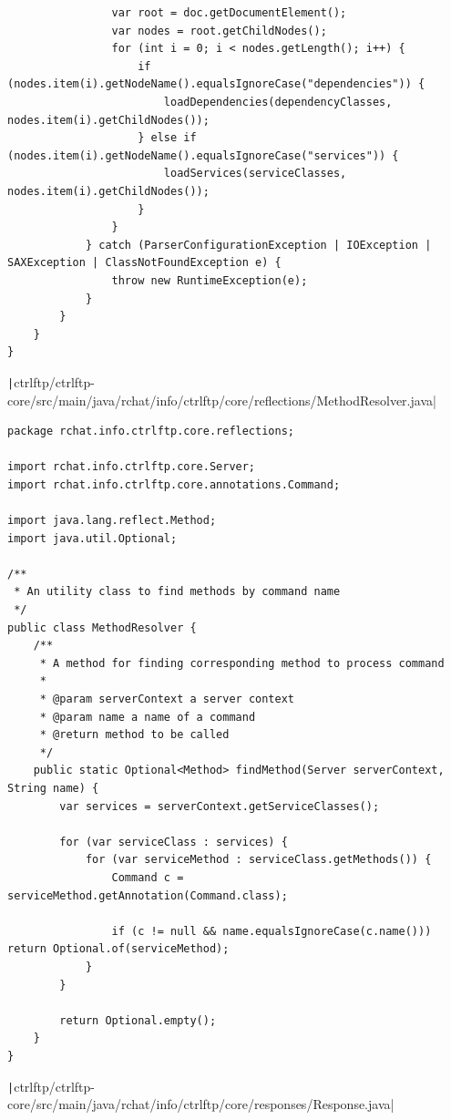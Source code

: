 \documentclass[a4paper,14pt]{extarticle}
\begin{document}
\begin{verbatim}
                var root = doc.getDocumentElement();
                var nodes = root.getChildNodes();
                for (int i = 0; i < nodes.getLength(); i++) {
                    if (nodes.item(i).getNodeName().equalsIgnoreCase("dependencies")) {
                        loadDependencies(dependencyClasses, nodes.item(i).getChildNodes());
                    } else if (nodes.item(i).getNodeName().equalsIgnoreCase("services")) {
                        loadServices(serviceClasses, nodes.item(i).getChildNodes());
                    }
                }
            } catch (ParserConfigurationException | IOException | SAXException | ClassNotFoundException e) {
                throw new RuntimeException(e);
            }
        }
    }
}
\end{verbatim}
\texttt|ctrlftp/ctrlftp-core/src/main/java/rchat/info/ctrlftp/core/reflections/MethodResolver.java|
\begin{verbatim}
package rchat.info.ctrlftp.core.reflections;

import rchat.info.ctrlftp.core.Server;
import rchat.info.ctrlftp.core.annotations.Command;

import java.lang.reflect.Method;
import java.util.Optional;

/**
 * An utility class to find methods by command name
 */
public class MethodResolver {
    /**
     * A method for finding corresponding method to process command
     *
     * @param serverContext a server context
     * @param name a name of a command
     * @return method to be called
     */
    public static Optional<Method> findMethod(Server serverContext, String name) {
        var services = serverContext.getServiceClasses();

        for (var serviceClass : services) {
            for (var serviceMethod : serviceClass.getMethods()) {
                Command c = serviceMethod.getAnnotation(Command.class);

                if (c != null && name.equalsIgnoreCase(c.name())) return Optional.of(serviceMethod);
            }
        }

        return Optional.empty();
    }
}
\end{verbatim}
\texttt|ctrlftp/ctrlftp-core/src/main/java/rchat/info/ctrlftp/core/responses/Response.java|
\end{document}
